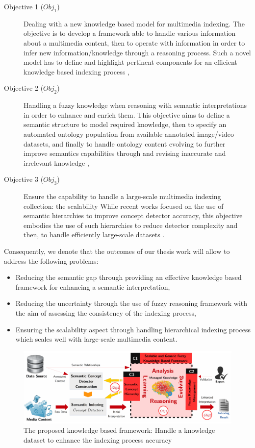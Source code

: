 \begin{description}
	\item[Objective 1 ($Obj_{1}$)] Dealing with a new knowledge based model for
		multimedia indexing. The objective is to develop a framework able to handle various information 
		about a multimedia content, then to operate with  information in order to infer new 
		information/knowledge through a reasoning process. Such a novel model has to define and highlight 
		pertinent components for an efficient knowledge based indexing process \citep{Zarka2011,Ksentini2012},
	\item[Objective 2 ($Obj_{2}$)] Handling a fuzzy knowledge 
		when reasoning with semantic interpretations in order to enhance and enrich them. This objective 
		aims to define a semantic structure to model required knowledge, then to specify an automated ontology 
		population from available annotated image/video datasets, and finally to handle ontology content evolving 
		to further improve semantics capabilities through  and revising inaccurate and irrelevant
		knowledge \citep{Elleuch2011,Zarka2015},
	\item[Objective 3 ($Obj_{3}$)] Ensure the capability to handle a large-scale multimedia indexing 
		collection: the scalability
		While recent works focused on the use of semantic hierarchies to improve concept detector accuracy, 
		this objective embodies the use of such hierarchies to reduce detector complexity and then, to handle 
		efficiently large-scale datasets \citep{Zarka2015a}.
\end{description}


	Consequently, we denote that the outcomes of our thesis work will allow to address the following problems:
	\begin{itemize}
		\item Reducing the semantic gap through providing an effective knowledge based 
			framework for enhancing a semantic interpretation,
		\item Reducing the uncertainty through the use of fuzzy reasoning framework with 
			the aim of assessing the consistency of the indexing process,
		\item Ensuring the scalability aspect through handling hierarchical indexing process 
			which scales well with large-scale multimedia content.
	\end{itemize}

	\begin{figure}
		\centering
		\includegraphics[scale=0.82]{figures/introduction__tmp.pdf}
		\caption{The proposed knowledge based framework: Handle a knowledge dataset to enhance the indexing process accuracy}
		\label{introduction_3}
	\end{figure}

